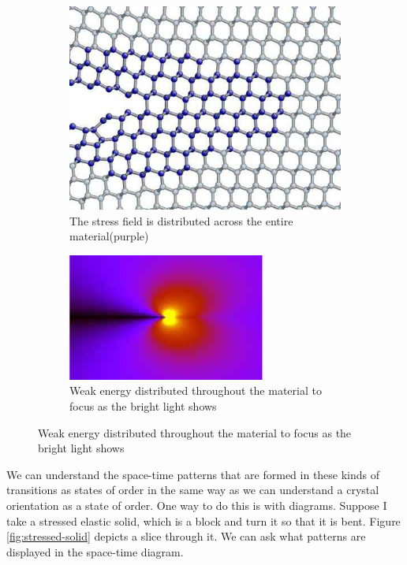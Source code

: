 \documentclass[]{article}
\begin{document}
\begin{figure}[H]
	\caption[Fracture Propagation]{Fracture Propagation\cite{bitzek2015atomistic}}\label{fig:fracture}
	\begin{subfigure}[t]{0.55\textwidth}
		\caption{The stress field is distributed across the entire material(purple)}\label{fig:stress:dist}
		\includegraphics[width=\textwidth]{fracture}
	\end{subfigure}
	\;\;\;\;
	\begin{subfigure}[t]{0.4\textwidth}
		\caption{Weak energy distributed throughout the material to focus as the bright light shows}\label{fig:stress-zoomed}
		\includegraphics[width=\textwidth]{stress-zoomed}
	\end{subfigure}
\end{figure}

We can understand the space-time patterns that are formed in these kinds of transitions as states of order in the same way as we can understand a crystal orientation as a state of order. One way to do this is with diagrams. Suppose I take a stressed elastic solid, which is a block and turn it so that it is bent. Figure \ref{fig:stressed-solid} depicts a slice through it. We can ask what patterns are displayed in the space-time diagram.
\end{document}
